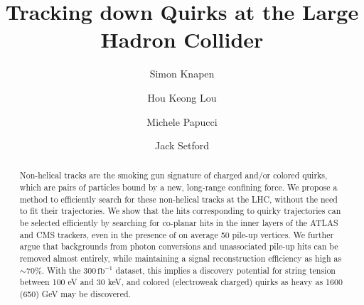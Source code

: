 \documentclass[10pt,aps,prd,nofootinbib,superscriptaddress,twocolumn,preprintnumbers,balancelastpage]{revtex4}
\newcommand{\gaga}{{\gamma\gamma}}
\begin{document}
\newcommand{\toname}{{\sqrt{s^{c}_{\gaga}}}}

\newcommand{\ion}{{\textrm{ion}}}
\newcommand{\Nu}{{\textrm{nu}}}
\newcommand{\GeV}{{\rm GeV}}
\newcommand{\TeV}{{\rm TeV}}
\newcommand{\fm}{{\rm fm}}
\renewcommand{\max}{{\rm max}}
\newcommand{\cm}{{\rm cm}}

\graphicspath{{Figures/}}

\title{
Tracking down Quirks at the Large Hadron Collider  
}

\author{Simon Knapen}
\author{Hou Keong Lou}
\author{Michele Papucci}
\author{Jack Setford}


\begin{abstract}
Non-helical tracks are the smoking gun signature of charged and/or colored quirks, which are pairs of particles bound by a new, long-range confining force. We propose a method to efficiently search for these non-helical tracks at the LHC, without the need to fit their trajectories. We show that the hits corresponding to quirky trajectories can be selected efficiently by searching for co-planar hits in the inner layers of the ATLAS and CMS trackers, even in the presence of on average 50 pile-up vertices. We further argue that backgrounds from photon conversions and unassociated pile-up  hits can be removed almost entirely, while maintaining a signal reconstruction efficiency as high as $\sim$70\%. With the $300\, \text{fb}^{-1}$ dataset, this implies a discovery potential for string tension between 100 eV and 30 keV, and colored (electroweak charged) quirks as heavy as 1600 (650) GeV may be discovered. 
 
%
\end{abstract}
\end{document}
